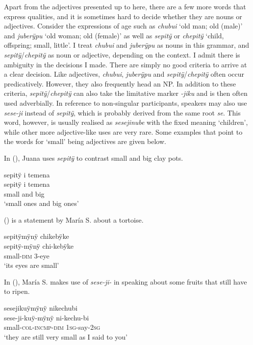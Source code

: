Apart from the adjectives presented up to here, there are a few more words that express qualities, and it is sometimes hard to decide whether they are nouns or adjectives. Consider the expressions of age such as \textit{chubui} ‘old man; old (male)’ and \textit{juberÿpu} ‘old woman; old (female)’ as well as \textit{sepitÿ} or \textit{chepitÿ} ‘child, offspring; small, little’. I treat \textit{chubui} and \textit{juberÿpu} as nouns in this grammar, and \textit{sepitÿ}/\textit{chepitÿ} as noun or adjective, depending on the context. I admit there is ambiguity in the decisions I made. There are simply no good criteria to arrive at a clear decision. Like adjectives, \textit{chubui}, \textit{juberÿpu} and \textit{sepitÿ}/\textit{chepitÿ} often occur predicatively. However, they also frequently head an NP. In addition to these criteria, \textit{sepitÿ}/\textit{chepitÿ} can also take the limitative marker \textit{-jiku} and is then often used adverbially. In reference to non-singular participants, speakers may also use \textit{sese-ji} instead of \textit{sepitÿ}, which is probably derived from the same root \textit{se}. This word, however, is usually realised as \textit{sesejinube} with the fixed meaning ‘children’, while other more adjective-like uses are very rare. Some examples that point to the words for ‘small’ being adjectives are given below.

In (), Juana uses \textit{sepitÿ} to contrast small and big clay pots.

\ea\label{ex:small1-1}
\begingl
\glpreamble sepitÿ i temena\\
\gla sepitÿ i temena\\
\glb small and big\\
\glft ‘small ones and big ones’
\endgl
\trailingcitation{[jxx-d110923l-2.35]}
\xe

() is a statement by María S. about a tortoise.

\ea\label{ex:small1-2}
\begingl
\glpreamble sepitÿmÿnÿ chikebÿke\\
\gla sepitÿ-mÿnÿ chi-kebÿke\\
\glb small-\textsc{dim} 3-eye\\
\glft ‘its eyes are small’
\endgl
\trailingcitation{[rxx-e121128s-4x.039]}
\xe

In (), María S. makes use of \textit{sese-ji-} in speaking about some fruits that still have to ripen.

\ea\label{ex:small2-1}
\begingl
\glpreamble sesejikuÿmÿnÿ nikechubi\\
\gla sese-ji-kuÿ-mÿnÿ ni-kechu-bi\\
\glb small-\textsc{col}-\textsc{incmp}-\textsc{dim} 1\textsc{sg}-say-2\textsc{sg}\\
\glft ‘they are still very small as I said to you’
\endgl
\trailingcitation{[rxx-e121126s-3.29]}
\xe

